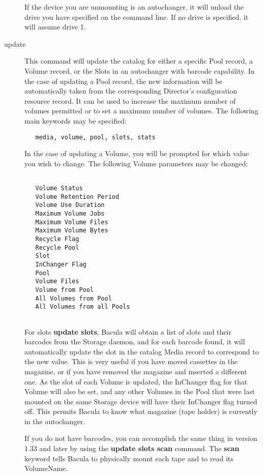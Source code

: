 \begin{description}
   If the device you are unmounting is an autochanger, it will unload
   the drive you have specified on the command line. If no drive is 
   specified, it will assume drive 1.

\label{UpdateCommand}
\item [update]
   This command will update the catalog for either a specific Pool record, a Volume
   record, or the Slots in an  autochanger with barcode capability. In the case
   of updating a  Pool record, the new information will be automatically taken
   from  the corresponding Director's configuration resource record. It  can be
   used to increase the maximum number of volumes permitted or  to set a maximum
   number of volumes. The following main  keywords may be specified:  
\footnotesize
\begin{verbatim}
   media, volume, pool, slots, stats
\end{verbatim}
\normalsize

In the case of updating a  Volume, you will be prompted for which value you
wish to change.  The following Volume parameters may be changed:  

\footnotesize
\begin{verbatim}
 
   Volume Status
   Volume Retention Period
   Volume Use Duration
   Maximum Volume Jobs
   Maximum Volume Files
   Maximum Volume Bytes
   Recycle Flag
   Recycle Pool
   Slot
   InChanger Flag
   Pool
   Volume Files
   Volume from Pool
   All Volumes from Pool
   All Volumes from all Pools
   
\end{verbatim}
\normalsize

   For slots {\bf update slots}, Bacula will obtain a list of slots and
   their barcodes from the Storage daemon, and for each barcode found, it
   will automatically update the slot in the catalog Media record to
   correspond to the new value.  This is very useful if you have moved
   cassettes in the magazine, or if you have removed the magazine and
   inserted a different one.  As the slot of each Volume is updated, the
   InChanger flag for that Volume will also be set, and any other Volumes
   in the Pool that were last mounted on the same Storage device
   will have their InChanger flag turned off.  This permits
   Bacula to know what magazine (tape holder) is currently in the
   autochanger.

   If you do not have barcodes, you can accomplish the same thing in
   version 1.33 and later by using the {\bf update slots scan} command.
   The {\bf scan} keyword tells Bacula to physically mount each tape and to
   read its VolumeName.


\end{description}
